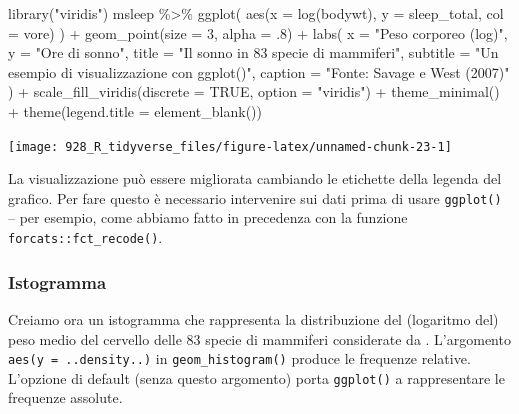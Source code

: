 \documentclass[
  10pt,
  italian,
  a4paper,
  extrafontsizes,onecolumn,openright
  ]{memoir}
\newenvironment{Shaded}{\begin{snugshade}}{\end{snugshade}}
\newcommand{\AttributeTok}[1]{\textcolor[rgb]{0.77,0.63,0.00}{#1}}
\newcommand{\ConstantTok}[1]{\textcolor[rgb]{0.00,0.00,0.00}{#1}}
\newcommand{\DecValTok}[1]{\textcolor[rgb]{0.00,0.00,0.81}{#1}}
\newcommand{\FunctionTok}[1]{\textcolor[rgb]{0.00,0.00,0.00}{#1}}
\newcommand{\NormalTok}[1]{#1}
\newcommand{\SpecialCharTok}[1]{\textcolor[rgb]{0.00,0.00,0.00}{#1}}
\newcommand{\StringTok}[1]{\textcolor[rgb]{0.31,0.60,0.02}{#1}}
\begin{document}
\begin{Shaded}
\begin{Highlighting}[]
\FunctionTok{library}\NormalTok{(}\StringTok{"viridis"}\NormalTok{)}
\NormalTok{msleep }\SpecialCharTok{\%\textgreater{}\%}
  \FunctionTok{ggplot}\NormalTok{(}
    \FunctionTok{aes}\NormalTok{(}\AttributeTok{x =} \FunctionTok{log}\NormalTok{(bodywt), }\AttributeTok{y =}\NormalTok{ sleep\_total, }\AttributeTok{col =}\NormalTok{ vore)}
\NormalTok{  ) }\SpecialCharTok{+}
  \FunctionTok{geom\_point}\NormalTok{(}\AttributeTok{size =} \DecValTok{3}\NormalTok{, }\AttributeTok{alpha =}\NormalTok{ .}\DecValTok{8}\NormalTok{) }\SpecialCharTok{+}
  \FunctionTok{labs}\NormalTok{(}
    \AttributeTok{x =} \StringTok{"Peso corporeo (log)"}\NormalTok{,}
    \AttributeTok{y =} \StringTok{"Ore di sonno"}\NormalTok{,}
    \AttributeTok{title =} \StringTok{"Il sonno in 83 specie di mammiferi"}\NormalTok{,}
    \AttributeTok{subtitle =} \StringTok{"Un esempio di visualizzazione con ggplot()"}\NormalTok{,}
    \AttributeTok{caption =} \StringTok{"Fonte: Savage e West (2007)"}
\NormalTok{  ) }\SpecialCharTok{+}
  \FunctionTok{scale\_fill\_viridis}\NormalTok{(}\AttributeTok{discrete =} \ConstantTok{TRUE}\NormalTok{, }\AttributeTok{option =} \StringTok{"viridis"}\NormalTok{) }\SpecialCharTok{+}
  \FunctionTok{theme\_minimal}\NormalTok{() }\SpecialCharTok{+}
  \FunctionTok{theme}\NormalTok{(}\AttributeTok{legend.title =} \FunctionTok{element\_blank}\NormalTok{()) }
\end{Highlighting}
\end{Shaded}

\begin{center}\texttt{[image: 928\_R\_tidyverse\_files/figure-latex/unnamed-chunk-23-1]} \end{center}

La visualizzazione può essere migliorata cambiando le etichette della legenda del grafico. Per fare questo è necessario intervenire sui dati prima di usare \texttt{ggplot()} -- per esempio, come abbiamo fatto in precedenza con la funzione \texttt{forcats::fct\_recode()}.

\hypertarget{istogramma}{%
\subsubsection{Istogramma}\label{istogramma}}

Creiamo ora un istogramma che rappresenta la distribuzione del (logaritmo del) peso medio del cervello delle 83 specie di mammiferi considerate da \textcite{savage2007quantitative}. L'argomento \texttt{aes(y\ =\ ..density..)} in \texttt{geom\_histogram()} produce le frequenze relative. L'opzione di default (senza questo argomento) porta \texttt{ggplot()} a rappresentare le frequenze assolute.
\end{document}
